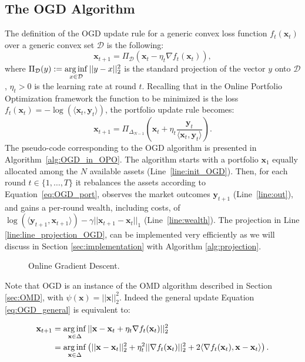 \subsection{The OGD Algorithm}
\label{sec:OGD}
The definition of the OGD update rule for a generic convex loss function $f_t(\mathbf{x}_t)$ over a generic convex set $\mathcal D$ is the following:
\begin{equation}\label{eq:OGD_general}
  \mathbf{x}_{t+1} = \Pi_{\mathcal D} \left( \mathbf{x}_t - \eta_t \nabla f_t(\mathbf{x}_t) \right),
\end{equation}
where $\Pi_{\mathcal D} (y) := \operatorname*{arg\,inf}\limits_{x \in \mathcal D } || y - x ||_2^2$ is the standard projection of the vector $y$ onto $\mathcal D$, $\eta_t > 0$ is the learning rate at round $t$.
Recalling that in the Online Portfolio Optimization framework the function to be minimized is the loss $f_t(\mathbf{x}_t) = -\log (\langle \mathbf{x}_t, \mathbf{y}_t \rangle )$, the portfolio update rule becomes:
\begin{equation} \label{eq:OGD_port}
   \mathbf{x}_{t+1}= \Pi_{\Delta_{N-1}}\left( \mathbf{x}_t+\eta_t \frac{\mathbf{y}_t}{\langle \mathbf{x}_t, \mathbf{y}_t \rangle}\right).
\end{equation}
The pseudo-code corresponding to the OGD algorithm is presented in Algorithm~\ref{alg:OGD_in_OPO}. 
The algorithm starts with a portfolio $\mathbf{x}_1$ equally allocated among the $N$ available assets (Line~\ref{line:init_OGD}).
Then, for each round $t \in \{ 1, \ldots, T \}$ it rebalances the assets according to Equation~\eqref{eq:OGD_port}, observes the market outcomes $\mathbf{y}_{t+1}$ (Line~\ref{line:out}), and gains a per-round wealth, including costs, of $\log(\langle \mathbf{y}_{t+1},\mathbf{x}_{t+1} \rangle) - \gamma|| \mathbf{x}_{t+1} - \mathbf{x}_{t} ||_1$ (Line~\ref{line:wealth}). The projection in Line \ref{line:line_projection_OGD}, can be implemented very efficiently as we will discuss in Section \ref{sec:implementation} with Algorithm \ref{alg:projection}.

\begin{figure}[ht!]
\centering

\caption{Online Gradient Descent.}
\label{fig:OGD}
\end{figure}

Note that OGD is an instance of the OMD algorithm described in Section \ref{sec:OMD}, with $\psi(\mathbf x)=||\mathbf x||_2^2$. Indeed the general update Equation \eqref{eq:OGD_general} is equivalent to:

\begin{align}
	\mathbf x_{t+1}&=\operatorname*{arg\,inf}\limits_{\mathbf x\in\Delta}||\mathbf x-\mathbf x_t+\eta_t\nabla f_t(\mathbf x_t)||_2^2\\
	&=\operatorname*{arg\,inf}\limits_{\mathbf x\in\Delta}\left(||\mathbf x-\mathbf x_t||_2^2+\eta_t^2||\nabla f_t(\mathbf x_t)||_2^2+2\langle\nabla f_t(\mathbf x_t),\mathbf x-\mathbf x_t\rangle\right).
\end{align}

